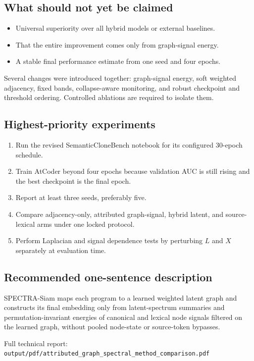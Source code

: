 \documentclass[10pt,a4paper]{article}
\newcommand{\code}[1]{\texttt{#1}}
\begin{document}
\subsection*{What should not yet be claimed}
\begin{itemize}
\item Universal superiority over all hybrid models or external baselines.
\item That the entire improvement comes only from graph-signal energy.
\item A stable final performance estimate from one seed and four epochs.
\end{itemize}

Several changes were introduced together: graph-signal energy, soft weighted
adjacency, fixed bands, collapse-aware monitoring, and robust checkpoint and
threshold ordering. Controlled ablations are required to isolate them.

\subsection*{Highest-priority experiments}
\begin{enumerate}
\item Run the revised SemanticCloneBench notebook for its configured 30-epoch
schedule.
\item Train AtCoder beyond four epochs because validation AUC is still rising
and the best checkpoint is the final epoch.
\item Report at least three seeds, preferably five.
\item Compare adjacency-only, attributed graph-signal, hybrid latent, and
source-lexical arms under one locked protocol.
\item Perform Laplacian and signal dependence tests by perturbing $L$ and $X$
separately at evaluation time.
\end{enumerate}

\subsection*{Recommended one-sentence description}

SPECTRA-Siam maps each program to a learned weighted latent graph and constructs
its final embedding only from latent-spectrum summaries and permutation-invariant
energies of canonical and lexical node signals filtered on the learned graph,
without pooled node-state or source-token bypasses.

\vfill
\begin{center}
\small
Full technical report: \code{output/pdf/attributed\_graph\_spectral\_method\_comparison.pdf}
\end{center}
\end{document}
